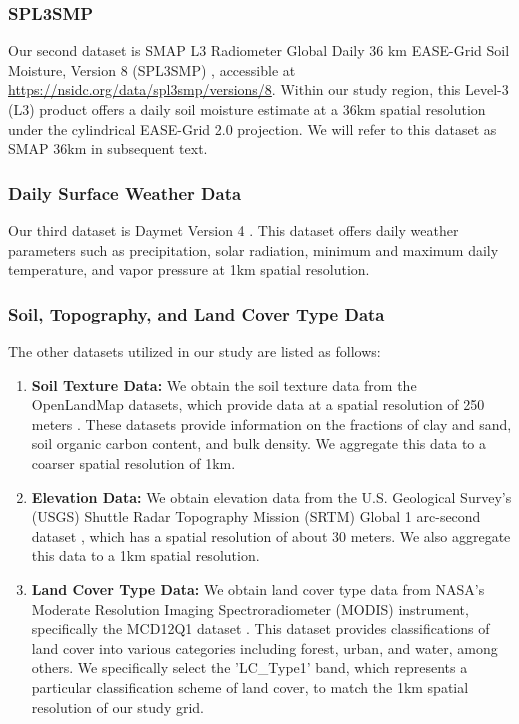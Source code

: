 \documentclass[11pt]{article}
\begin{document}
\subsubsection*{SPL3SMP}
Our second dataset is SMAP L3 Radiometer Global Daily 36 km EASE-Grid Soil Moisture, Version 8 (SPL3SMP) \citep{o2021smap}, accessible at \url{https://nsidc.org/data/spl3smp/versions/8}. Within our study region, this Level-3 (L3) product offers a daily soil moisture estimate at a 36km spatial resolution under the cylindrical EASE-Grid 2.0 \citep{brodzik2012ease} projection. We will refer to this dataset as SMAP 36km in subsequent text.



\subsubsection*{Daily Surface Weather Data}
Our third dataset is Daymet Version 4 \citep{thornton1840daymet}. This dataset offers daily weather parameters such as precipitation, solar radiation, minimum and maximum daily temperature, and vapor pressure at 1km spatial resolution. 

\subsubsection*{Soil, Topography, and Land Cover Type Data}
The other datasets utilized in our study are listed as follows:
\begin{enumerate}
\item \textbf{Soil Texture Data:} We obtain the soil texture data from the OpenLandMap datasets, which provide data at a spatial resolution of 250 meters \citep{hengl2018clay}. These datasets provide information on the fractions of clay and sand, soil organic carbon content, and bulk density. We aggregate this data to a coarser spatial resolution of 1km.


\item \textbf{Elevation Data:}  We obtain elevation data from the U.S. Geological Survey's (USGS) Shuttle Radar Topography Mission (SRTM) Global 1 arc-second dataset \citep{farr2007shuttle}, which has a spatial resolution of about 30 meters. We also aggregate this data to a 1km spatial resolution.
    
    \item \textbf{Land Cover Type Data:} We obtain land cover type data from NASA's Moderate Resolution Imaging Spectroradiometer (MODIS) instrument, specifically the MCD12Q1 dataset \citep{friedl2022modis}. This dataset provides classifications of land cover into various categories including forest, urban, and water, among others. We specifically select the 'LC\_Type1' band, which represents a particular classification scheme of land cover, to match the 1km spatial resolution of our study grid.
 \end{enumerate}
 
\end{document}
